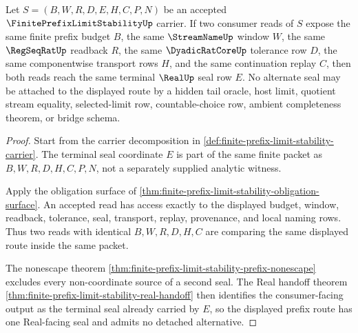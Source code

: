 \begin{theorem}
\label{thm:finite-prefix-limit-stability-route-determinacy}
Let $S=(B,W,R,D,E,H,C,P,N)$ be an accepted $\FinitePrefixLimitStabilityUp$ carrier. If two consumer reads of $S$ expose the same finite prefix budget $B$, the same $\StreamNameUp$ window $W$, the same $\RegSeqRatUp$ readback $R$, the same $\DyadicRatCoreUp$ tolerance row $D$, the same componentwise transport rows $H$, and the same continuation replay $C$, then both reads reach the same terminal $\RealUp$ seal row $E$. No alternate seal may be attached to the displayed route by a hidden tail oracle, host limit, quotient stream equality, selected-limit row, countable-choice row, ambient completeness theorem, or bridge schema.
\end{theorem}
\begin{proof}
Start from the carrier decomposition in \autoref{def:finite-prefix-limit-stability-carrier}. The terminal seal coordinate $E$ is part of the same finite packet as $B,W,R,D,H,C,P,N$, not a separately supplied analytic witness.

Apply the obligation surface of \autoref{thm:finite-prefix-limit-stability-obligation-surface}. An accepted read has access exactly to the displayed budget, window, readback, tolerance, seal, transport, replay, provenance, and local naming rows. Thus two reads with identical $B,W,R,D,H,C$ are comparing the same displayed route inside the same packet.

The nonescape theorem \autoref{thm:finite-prefix-limit-stability-prefix-nonescape} excludes every non-coordinate source of a second seal. The Real handoff theorem \autoref{thm:finite-prefix-limit-stability-real-handoff} then identifies the consumer-facing output as the terminal seal already carried by $E$, so the displayed prefix route has one Real-facing seal and admits no detached alternative.
\end{proof}

